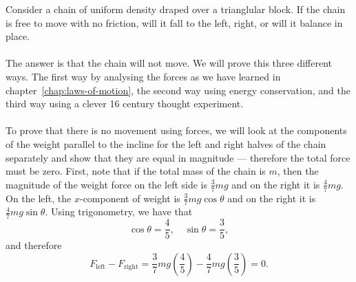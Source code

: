 \documentclass[../classical_mechanics.tex]{subfiles}
\begin{document}
        \begin{example}
            Consider a chain of uniform density draped over a trianglular block.
            If the chain is free to move with no friction, will it fall to the left, right, or will it balance in place.

            \paragraph{}
            The answer is that the chain will not move.
            We will prove this three different ways.
            The first way by analysing the forces as we have learned in chapter~\ref{chap:laws-of-motion}, the second way using energy conservation, and the third way using a clever 16 century thought experiment.

            \paragraph{}
            To prove that there is no movement using forces, we will look at the components of the weight parallel to the incline for the left and right halves of the chain separately and show that they are equal in magnitude --- therefore the total force must be zero.
            First, note that if the total mass of the chain is $m$, then the magnitude of the weight force on the left side is $\frac{3}{7}mg$ and on the right it is $\frac{4}{7}mg$.
            On the left, the $x$-component of weight is $\frac{3}{7}mg\cos\theta$ and on the right it is $\frac{4}{7}mg\sin\theta$.
            Using trigonometry, we have that
            \begin{equation}
                \cos\theta=\frac{4}{5},\quad\sin\theta=\frac{3}{5},
            \end{equation}
            and therefore
            \begin{equation}
                F_\text{left}-F_\text{right}=\frac{3}{7}mg(\frac{4}{5})-\frac{4}{7}mg(\frac{3}{5})=0.
            \end{equation}


\end{example}
\end{document}
